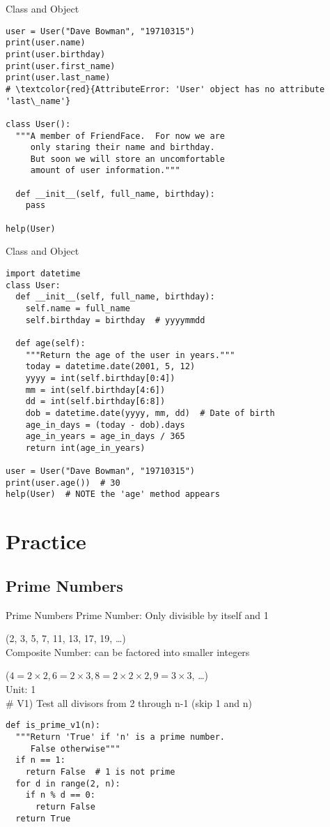 \documentclass{beamer}
\begin{document}
\begin{frame}[fragile]{Class and Object}
\begin{verbatim}
user = User("Dave Bowman", "19710315")
print(user.name)
print(user.birthday)
print(user.first_name)
print(user.last_name)
# \textcolor{red}{AttributeError: 'User' object has no attribute 'last\_name'}

class User():
  """A member of FriendFace.  For now we are 
     only staring their name and birthday.
     But soon we will store an uncomfortable 
     amount of user information."""
  
  def __init__(self, full_name, birthday):
    pass

help(User)
\end{verbatim}
\end{frame}
\begin{frame}[fragile]{Class and Object}
\begin{verbatim}
import datetime
class User:
  def __init__(self, full_name, birthday):
    self.name = full_name
    self.birthday = birthday  # yyyymmdd
  
  def age(self):
    """Return the age of the user in years."""
    today = datetime.date(2001, 5, 12)
    yyyy = int(self.birthday[0:4])
    mm = int(self.birthday[4:6])
    dd = int(self.birthday[6:8])
    dob = datetime.date(yyyy, mm, dd)  # Date of birth
    age_in_days = (today - dob).days
    age_in_years = age_in_days / 365
    return int(age_in_years)

user = User("Dave Bowman", "19710315")
print(user.age())  # 30
help(User)  # NOTE the 'age' method appears
\end{verbatim}
\end{frame}

\section{Practice}
\subsection{Prime Numbers}

\begin{frame}[fragile]{Prime Numbers}
Prime Number: Only divisible by itself and 1\par
\hspace{2.5cm}(2, 3, 5, 7, 11, 13, 17, 19, \dots)\\
Composite Number: can be factored into smaller integers\par
\hspace{3cm}($4=2\times2,6=2\times3,8=2\times2\times2,9=3\times3$, \dots)\\
Unit: 1\\
\# V1) Test all divisors from 2 through n-1 (skip 1 and n) \vspace{-.5em}
\begin{verbatim}
def is_prime_v1(n):
  """Return 'True' if 'n' is a prime number.
     False otherwise"""
  if n == 1:
    return False  # 1 is not prime
  for d in range(2, n):
    if n % d == 0:
      return False
  return True
\end{verbatim}
\end{frame}
\end{document}
